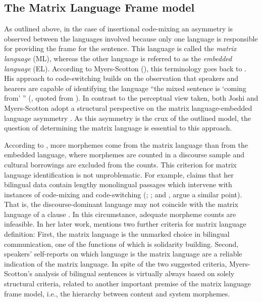 \subsection {The Matrix Language Frame model}
As outlined above, in the case of insertional code-mixing an asymmetry is observed between the languages involved because only one language is responsible for providing the frame for the sentence. This language is called the \textit{matrix language} (ML), whereas the other language is referred to as the \textit{embedded language} (EL). According to Myers-Scotton (\citeyear{myers-scotton-duelling-1993}), this terminology goes back to \citet{joshi85}. His approach to code-switching builds on the observation that speakers and hearers are capable of identifying the language ``the mixed sentence is `coming from' '' (\citealt{joshi85}, quoted from \citealt[35]{myers-scotton-duelling-1993}). In contrast to the perceptual view taken, both Joshi and Myers-Scotton adopt a structural perspective on the matrix language-embedded language asymmetry \citep[cf.][35--37]{myers-scotton-duelling-1993}. As this asymmetry is the crux of the outlined model, the question of determining the matrix language is essential to this approach. 

According to \citet[68]{myers-scotton-duelling-1993}, more morphemes come from the matrix language than from the embedded language, where morphemes are counted in a discourse sample and cultural borrowings are excluded from the counts. This criterion for matrix language identification is not unproblematic. For example, \citet[19]{muhamedowa-untersuchung-2006} claims that her bilingual data contain lengthy monolingual passages which intervene with instances of code-mixing and code-switching (\citealt[102]{haust-codeswitching-1995}; \citealt[154]{boumans-syntax-1998}; and \citealt[196]{hlavac-second-generation-2003}, argue a similar point). That is, the discourse-dominant language may not coincide with the matrix language of a clause \citep[cf.][]{heller-conversation-1988}. In this circumstance, adequate morpheme counts are infeasible. In her later work, \citet[237]{milroy-lexically-1995} mentions two further criteria for matrix language definition: First, the matrix language is the unmarked choice in bilingual communication, one of the functions of which is solidarity building. Second, speakers' self-reports on which language is the matrix language are a reliable indication of the matrix language. In spite of the two suggested criteria, Myers-Scotton's analysis of bilingual sentences is virtually always based on solely structural criteria, related to another important premise of the matrix language frame model, i.e., the hierarchy between content and system morphemes.

